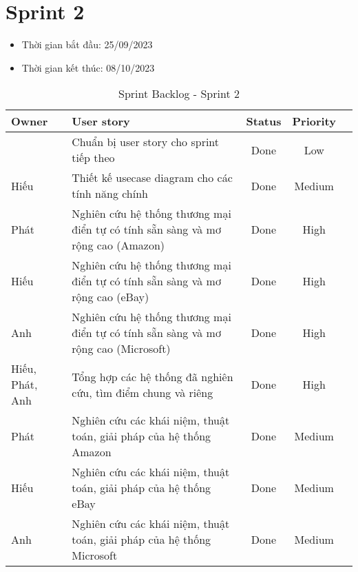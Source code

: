 \section{Sprint 2}
\begin{itemize}
    \item Thời gian bắt đầu: 25/09/2023
    \item Thời gian kết thúc: 08/10/2023
\end{itemize} 
\begin{table}[H]
    \begin{tabular}{|m{2.5cm}|m{9cm}|c|c|c|}
    \hline
    \textbf{Owner}  & \textbf{User story}                                & \textbf{Status}  & \textbf{Priority} \\ \hline
                   & Chuẩn bị user story cho sprint tiếp theo                              & Done                              & Low           \\ \hline
    Hiếu                 & Thiết kế usecase diagram cho các tính năng chính                         & Done                              & Medium            \\ \hline
    Phát                 & Nghiên cứu hệ thống thương mại điển tự có tính sẵn sàng và mơ rộng cao (Amazon)                             & Done                              & High           \\ \hline
    Hiếu                & Nghiên cứu hệ thống thương mại điển tự có tính sẵn sàng và mơ rộng cao (eBay)                       & Done                              & High           \\ \hline
    Anh                 & Nghiên cứu hệ thống thương mại điển tự có tính sẵn sàng và mơ rộng cao (Microsoft)                               & Done                              & High           \\ \hline
    Hiếu, Phát, Anh                 & Tổng hợp các hệ thống đã nghiên cứu, tìm điểm chung và riêng                          & Done                              & High           \\ \hline
    Phát                 & Nghiên cứu các khái niệm, thuật toán, giải pháp của hệ thống Amazon                        & Done                              & Medium           \\ \hline
    Hiếu                & Nghiên cứu các khái niệm, thuật toán, giải pháp của hệ thống eBay                        & Done                              & Medium           \\ \hline
    Anh                 & Nghiên cứu các khái niệm, thuật toán, giải pháp của hệ thống Microsoft                        & Done                              & Medium           \\ \hline
    \end{tabular}
    \caption{Sprint Backlog - Sprint 2}
    \label{tab:sprint-2}
\end{table}
